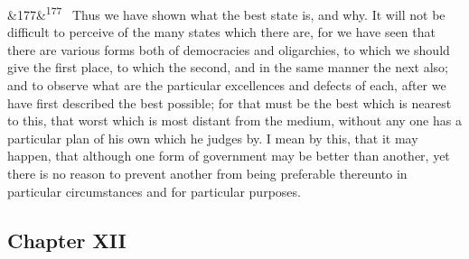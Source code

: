\documentclass[12pt]{article}
\newcommand{\para}[1][]{\par\noindent\ifx&#1&\else\textsuperscript{\footnotesize #1}~\fi}
\begin{document}
\para[177] Thus we have shown what the best state is, and why. It will not be difficult to perceive of the many states which there are, for we have seen that there are various forms both of democracies and oligarchies, to which we should give the first place, to which the second, and in the same manner the next also; and to observe what are the particular excellences and defects of each, after we have first described the best possible; for that must be the best which is nearest to this, that worst which is most distant from the medium, without any one has a particular plan of his own which he judges by. I mean by this, that it may happen, that although one form of government may be better than another, yet there is no reason to prevent another from being preferable thereunto in particular circumstances and for particular purposes.

\subsection*{Chapter XII}
\end{document}
